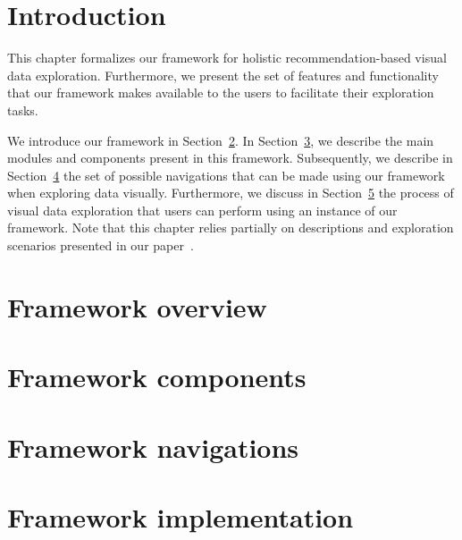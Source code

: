 \section{Introduction}
This chapter formalizes our framework for holistic recommendation-based visual data exploration. Furthermore, we present the set of features and functionality that our framework makes available to the users to facilitate their exploration tasks. 



We introduce our framework in Section~\ref{sec:frame-overview}. 
In Section~\ref{sec:frame-comp}, we describe the main modules and components present in this framework.
Subsequently, we describe in Section~\ref{sec:frame-navi} the set of possible navigations that can be made using our framework when exploring data visually.
Furthermore, we discuss in Section~\ref{sec:frame-process} the process of visual data exploration that users can perform using an instance of our framework. 
Note that this chapter relies partially on descriptions and exploration scenarios presented in our paper~\cite{BHBK18:Demo}.


\section{Framework overview}
\label{sec:frame-overview}

\section{Framework components}
\label{sec:frame-comp}


\section{Framework navigations}
\label{sec:frame-navi}


\section{Framework implementation}
\label{sec:frame-process}




